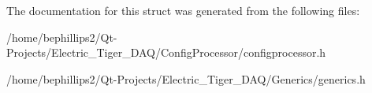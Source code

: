 The documentation for this struct was generated from the following files\+:\begin{DoxyCompactItemize}
\item 
/home/bephillips2/\+Qt-\/\+Projects/\+Electric\+\_\+\+Tiger\+\_\+\+D\+A\+Q/\+Config\+Processor/configprocessor.\+h\item 
/home/bephillips2/\+Qt-\/\+Projects/\+Electric\+\_\+\+Tiger\+\_\+\+D\+A\+Q/\+Generics/generics.\+h\end{DoxyCompactItemize}
